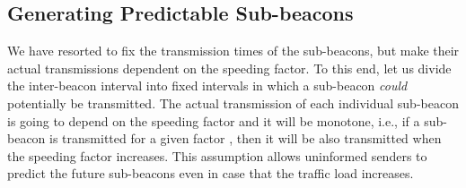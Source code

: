 \documentclass[journal,english,twocolumn,10pt,letterpaper]{IEEEtran}
\begin{document}
\subsection{Generating Predictable Sub-beacons}
\label{sec:gener-pred-extra-1}

We have resorted to fix the transmission times of the sub-beacons, but make
their actual transmissions dependent on the speeding factor. To this end, let
us divide the inter-beacon interval into fixed intervals in which a sub-beacon
\emph{could} potentially be transmitted. The actual transmission of each
individual sub-beacon is going to depend on the speeding factor  and it
will be monotone, i.e., if a sub-beacon is transmitted for a given factor ,
then it will be also transmitted when the speeding factor increases. This
assumption allows uninformed senders to predict the future sub-beacons even in
case that the traffic load increases.
\end{document}
